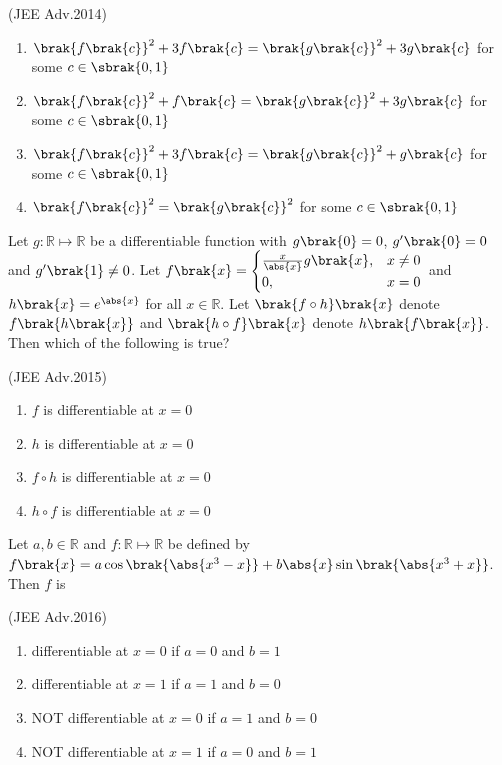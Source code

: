     \hfill(JEE Adv.2014)
    
    \begin{enumerate}
        \item ${\brak{f\brak{c}}}^2+3f\brak{c}={\brak{g\brak{c}}}^2+3g\brak{c}$ for some $c\in \sbrak{0,1}$
        \item ${\brak{f\brak{c}}}^2+f\brak{c}={\brak{g\brak{c}}}^2+3g\brak{c}$ for some $c\in \sbrak{0,1}$
        \item ${\brak{f\brak{c}}}^2+3f\brak{c}={\brak{g\brak{c}}}^2+g\brak{c}$ for some $c\in \sbrak{0,1}$
        \item ${\brak{f\brak{c}}}^2={\brak{g\brak{c}}}^2$ for some $c\in \sbrak{0,1}$ 
    \end{enumerate}


    \item 
	    Let $g: \mathbb{R}\mapsto \mathbb{R}$ be a differentiable function with $g\brak{0}=0$, $g^{\prime}\brak{0}=0$ and $g^{\prime}\brak{1}\neq 0$. Let $f\brak{x}=
        \begin{cases}
		\frac{x}{\abs{x}}g\brak{x}, & x\neq 0 \\
            0, & x=0
        \end{cases}$ 
	and $h\brak{x}=e^{\abs{x}}$ for all $x\in \mathbb{R}$. Let $\brak{f\circ h}\brak{x}$ denote $f\brak{h\brak{x}}$ and $\brak{h\circ f}\brak{x}$ denote $h\brak{f\brak{x}}$. Then which of the following is true? 

    \hfill(JEE Adv.2015)
    
    \begin{enumerate}        
        \item $f$ is differentiable at $x=0$ 
        \item $h$ is differentiable at $x=0$ 
        \item $f\circ h$ is differentiable at $x=0$ 
        \item $h\circ f$ is differentiable at $x=0$  
    \end{enumerate}


    \item 
	    Let $a, b\in \mathbb{R}$ and $f: \mathbb{R}\mapsto \mathbb{R}$ be defined by $f\brak{x}=a\cos \brak{\abs{x^3-x}} +b\abs{x}\sin \brak{\abs{x^3+x}}$. Then $f$ is 
   
    \hfill(JEE Adv.2016)
    
    \begin{enumerate}
        \item differentiable at $x=0$ if $a=0$ and $b=1$
        \item differentiable at $x=1$ if $a=1$ and $b=0$
        \item {NOT} differentiable at $x=0$ if $a=1$ and $b=0$
        \item {NOT} differentiable at $x=1$ if $a=0$ and $b=1$
    \end{enumerate}


